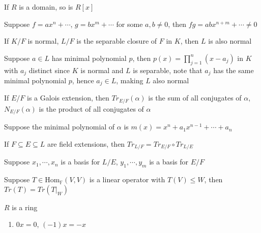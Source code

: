\documentclass[main]{subfiles}
\begin{document}
\begin{exercise}
If $R$ is a domain, so is $R[x]$
\end{exercise}

\begin{solution}
Suppose $f=ax^n+\cdots$, $g=bx^m+\cdots$ for some $a,b\neq0$, then $fg=abx^{n+m}+\cdots\neq0$
\end{solution}

\begin{exercise}
If $K/F$ is normal, $L/F$ is the separable closure of $F$ in $K$, then $L$ is also normal
\end{exercise}

\begin{solution}
Suppose $a\in L$ has minimal polynomial $p$, then $p(x)=\prod_{j=1}^n(x-a_j)$ in $K$ with $a_j$ distinct since $K$ is normal and $L$ is separable, note that $a_j$ has the same minimal polynomial $p$, hence $a_j\in L$, making $L$ also normal
\end{solution}

\begin{exercise}
If $E/F$ is a Galois extension, then $Tr_{E/F}(\alpha)$ is the sum of all conjugates of $\alpha$, $N_{E/F}(\alpha)$ is the product of all conjugates of $\alpha$
\end{exercise}

\begin{solution}
Suppose the minimal polynomial of $\alpha$ is $m(x)=x^n+a_{1}x^{n-1}+\cdots+a_n$
\end{solution}

\begin{exercise}
If $F\subseteq E\subseteq L$ are field extensions, then $Tr_{L/F}=Tr_{E/F}\circ Tr_{L/E}$
\end{exercise}

\begin{solution}
Suppose $x_1,\cdots,x_n$ is a basis for $L/E$, $y_1,\cdots,y_m$ is a basis for $E/F$
\end{solution}

\begin{exercise}\label{T:V->W<=W => Tr(T)=Tr(T|W)}
Suppose $T\in\mathrm{Hom}_{\mathbb F}(V,V)$ is a linear operator with $T(V)\leq W$, then $Tr(T)=Tr(T|_W)$
\end{exercise}

\begin{exercise}\label{Mundane properties of rings}
$R$ is a ring \par
\begin{enumerate}[label=\textbf{\arabic*.}, ref=\ref{Mundane properties of rings}.\arabic*, leftmargin=*]
\item $0x=0$, $(-1)x=-x$
\end{enumerate}
\end{exercise}
\end{document}
